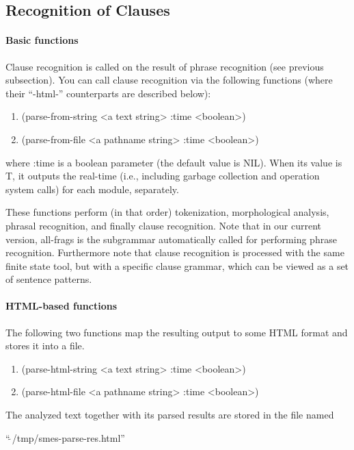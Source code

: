 \subsection{Recognition of Clauses}
\paragraph{Basic functions}
Clause recognition is called on the result of phrase recognition (see
previous subsection). You can call clause recognition via the following
functions (where their ``{\sc -html-}'' counterparts are described below):
\begin{enumerate}

\item   {\sc (parse-from-string <a text string>  :time <boolean>)}
\item   {\sc (parse-from-file <a pathname string> :time <boolean>)}

\end{enumerate}

\noindent where {\sc :time} is a boolean parameter (the default value
is {\sc NIL}). When its value is
{\sc T}, it outputs the real-time (i.e., including garbage collection
and operation system calls) for each module, separately.

These functions perform (in that order) tokenization, morphological analysis,
phrasal recognition, and finally clause recognition. Note that in our
current version, {\sc all-frags} is the subgrammar automatically
called for performing phrase recognition. Furthermore note that clause
recognition is processed with the same finite state tool, but with a
specific clause grammar, which can be viewed as a set of sentence
patterns.

\paragraph{HTML-based functions}

The following two functions map the resulting output to some HTML
format and stores it into a file.
\begin{enumerate}

\item   {\sc (parse-html-string <a text string>  :time <boolean>)}
\item   {\sc (parse-html-file <a pathname string> :time <boolean>)}

\end{enumerate}

The analyzed text together with its parsed results
are stored in the file named
\begin{center}
``$\tilde{~}$/tmp/smes-parse-res.html''
\end{center}

